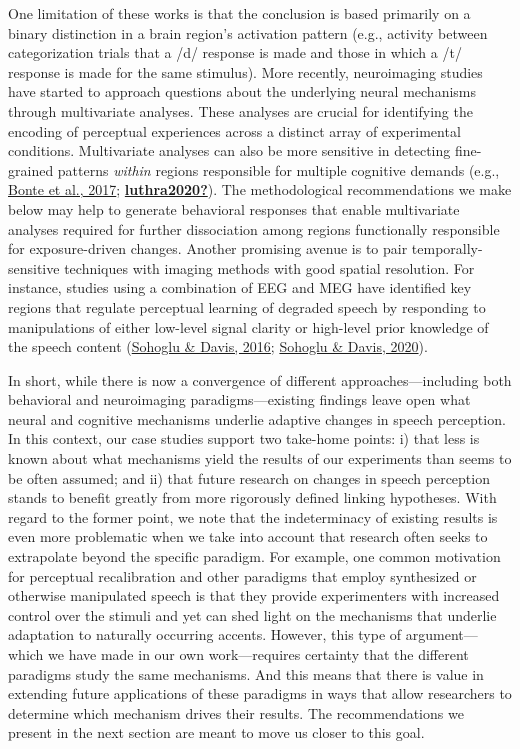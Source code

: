 \documentclass[
  11pt,
  man,floatsintext]{apa6}
\begin{document}
One limitation of these works is that the conclusion is based primarily on a binary distinction in a brain region's activation pattern (e.g., activity between categorization trials that a /d/ response is made and those in which a /t/ response is made for the same stimulus). More recently, neuroimaging studies have started to approach questions about the underlying neural mechanisms through multivariate analyses. These analyses are crucial for identifying the encoding of perceptual experiences across a distinct array of experimental conditions. Multivariate analyses can also be more sensitive in detecting fine-grained patterns \emph{within} regions responsible for multiple cognitive demands (e.g., \protect\hyperlink{ref-bonte2017}{Bonte et al., 2017}; \protect\hyperlink{ref-luthra2020}{\textbf{luthra2020?}}). The methodological recommendations we make below may help to generate behavioral responses that enable multivariate analyses required for further dissociation among regions functionally responsible for exposure-driven changes. Another promising avenue is to pair temporally-sensitive techniques with imaging methods with good spatial resolution. For instance, studies using a combination of EEG and MEG have identified key regions that regulate perceptual learning of degraded speech by responding to manipulations of either low-level signal clarity or high-level prior knowledge of the speech content (\protect\hyperlink{ref-sohoglu-davis2016}{Sohoglu \& Davis, 2016}; \protect\hyperlink{ref-sohoglu-davis2020}{Sohoglu \& Davis, 2020}).

In short, while there is now a convergence of different approaches---including both behavioral and neuroimaging paradigms---existing findings leave open what neural and cognitive mechanisms underlie adaptive changes in speech perception. In this context, our case studies support two take-home points: i) that less is known about what mechanisms yield the results of our experiments than seems to be often assumed; and ii) that future research on changes in speech perception stands to benefit greatly from more rigorously defined linking hypotheses. With regard to the former point, we note that the indeterminacy of existing results is even more problematic when we take into account that research often seeks to extrapolate beyond the specific paradigm. For example, one common motivation for perceptual recalibration and other paradigms that employ synthesized or otherwise manipulated speech is that they provide experimenters with increased control over the stimuli and yet can shed light on the mechanisms that underlie adaptation to naturally occurring accents. However, this type of argument---which we have made in our own work---requires certainty that the different paradigms study the same mechanisms. And this means that there is value in extending future applications of these paradigms in ways that allow researchers to determine which mechanism drives their results. The recommendations we present in the next section are meant to move us closer to this goal.
\end{document}
